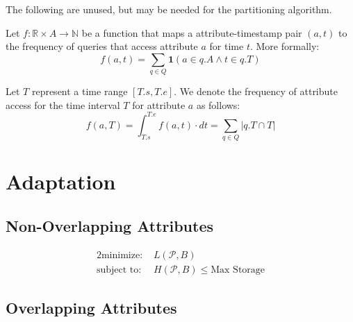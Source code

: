\documentclass[twocolumn]{svjour3}          %
\begin{document}
\noindent The following are unused, but may be needed for the partitioning
algorithm.

Let $f: \mathbb{R}\times A \rightarrow \mathbb{N}$ be a function that maps a
attribute-timestamp pair $(a, t)$ to the frequency of queries that access
attribute $a$ for time $t$. More formally:
\begin{equation}
f(a,t) = \sum_{q\in Q} \textbf{1}(a\in q.A \wedge t\in q.T)
\end{equation}
 
Let $T$ represent a time range $[T.s, T.e]$. We denote the frequency of
attribute access for the time interval $T$ for attribute $a$ as follows:
\begin{equation}
f(a, T) = \int_{T.s}^{T.e} f(a, t)\cdot dt =  \sum_{q\in Q} |q.T \cap T| 
\end{equation}



\section{Adaptation}

\subsection{Non-Overlapping Attributes}



 \begin{alignat*}{2}
    \text{minimize: }   & L(\mathcal{P}, B)   \\
    \text{subject to: } & H(\mathcal{P}, B) \leq \text{Max Storage}
  \end{alignat*}

\subsection{Overlapping Attributes}
\end{document}
